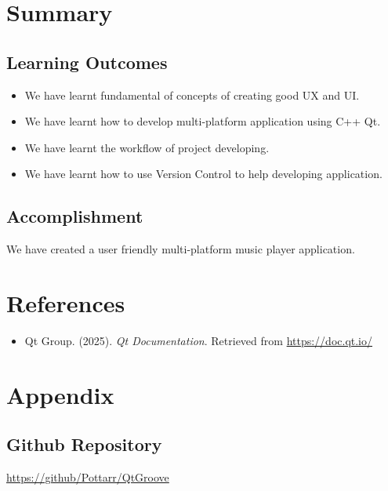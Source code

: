 \documentclass[12pt]{report} %
\begin{document}
\chapter{Summary}
\section{Learning Outcomes}
\begin{itemize}
    \item We have learnt fundamental of concepts of creating good UX and UI.
    \item We have learnt how to develop multi-platform application using C++ Qt.
    \item We have learnt the workflow of project developing.
    \item We have learnt how to use Version Control to help developing application.
\end{itemize}

\section{Accomplishment}
\hspace{1cm}We have created a user friendly multi-platform music player application.

\newpage

\chapter{References}
\begin{itemize}
    \item Qt Group. (2025). \textit{Qt Documentation}. Retrieved from \url{https://doc.qt.io/}
\end{itemize}

\newpage

\chapter{Appendix}

\section{Github Repository}
\url{https://github/Pottarr/QtGroove}
\end{document}
